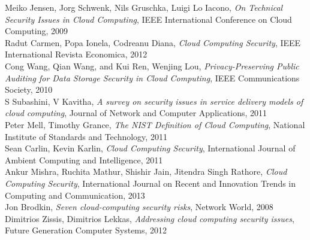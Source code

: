 \documentclass[a4paper, 8pt]{article} %
\begin{document}
\begin{thebibliography}{1}
Meiko Jensen, Jorg Schwenk, Nils Gruschka, Luigi Lo Iacono, \emph{On Technical Security Issues in Cloud Computing}, \relax IEEE International Conference on Cloud Computing, 2009\\
Radut Carmen, Popa Ionela, Codreanu Diana, \emph{Cloud Computing Security}, \relax IEEE International Revista Economica, 2012\\
Cong Wang, Qian Wang, and Kui Ren, Wenjing Lou, \emph{Privacy-Preserving Public Auditing for Data Storage Security in Cloud Computing}, \relax IEEE Communications Society, 2010\\
S Subashini, V Kavitha, \emph{A survey on security issues in service delivery models of cloud computing}, \relax Journal of Network and Computer Applications, 2011\\
Peter Mell, Timothy Grance, \emph{The NIST Definition of Cloud Computing}, \relax National Institute of Standards and Technology, 2011\\
Sean Carlin, Kevin Karlin, \emph{Cloud Computing Security}, \relax International Journal of Ambient Computing and Intelligence, 2011\\
Ankur Mishra, Ruchita Mathur, Shishir Jain, Jitendra Singh Rathore, \emph{Cloud Computing Security}, \relax International Journal on Recent and Innovation Trends in Computing and Communication, 2013\\
Jon Brodkin, \emph{Seven cloud-computing security risks}, \relax Network World, 2008\\
Dimitrios Zissis, Dimitrios Lekkas, \emph{Addressing cloud computing security issues}, \relax Future Generation Computer Systems, 2012\\

\end{thebibliography}

\fi

\end{document}

